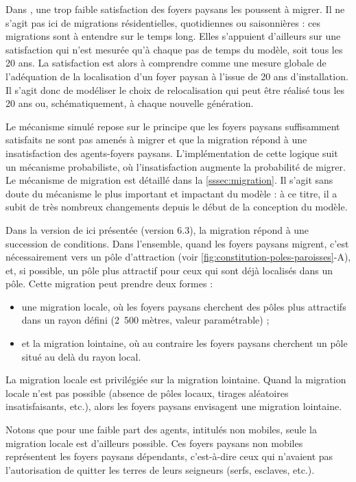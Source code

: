 \begin{tcolorbox}[breakable,left=0pt,right=0pt,top=0pt,bottom=0pt,
	colback=gray!15,colframe=gray!15,width=\dimexpr\textwidth\relax, 
	enlarge left by=0mm, boxsep=5pt,arc=0pt,outer arc=0pt,parbox=false]
Dans \simfeodal{}, une trop faible satisfaction des foyers paysans les poussent à migrer.
Il ne s'agit pas ici de migrations résidentielles, quotidiennes ou saisonnières : ces migrations sont à entendre sur le temps long.
Elles s'appuient d'ailleurs sur une satisfaction qui n'est mesurée qu'à chaque pas de temps du modèle, soit tous les 20 ans.
La satisfaction est alors à comprendre comme une mesure globale de l'adéquation de la localisation d'un foyer paysan à l'issue de 20 ans d'installation.
Il s'agit donc de modéliser le choix de relocalisation qui peut être réalisé tous les 20 ans ou, schématiquement, à chaque nouvelle génération.

Le mécanisme simulé repose sur le principe que les foyers paysans suffisamment satisfaits ne sont pas amenés à migrer et que la migration répond à une insatisfaction des agents-foyers paysans.
L'implémentation de cette logique suit un mécanisme probabiliste, où l'insatisfaction augmente la probabilité de migrer.
Le mécanisme de migration est détaillé dans la \cref{sssec:migration}.
Il s'agit sans doute du mécanisme le plus important et impactant du modèle \simfeodal{} : à ce titre, il a subit de très nombreux changements depuis le début de la conception du modèle.

Dans la version de \simfeodal{} ici présentée (version 6.3), la migration répond à une succession de conditions.
Dans l'ensemble, quand les foyers paysans migrent, c'est nécessairement vers un pôle d'attraction (voir \cref{fig:constitution-poles-paroisses}-A), et, si possible, un pôle plus attractif pour ceux qui sont déjà localisés dans un pôle.
Cette migration peut prendre deux formes :
\begin{itemize}
	\item une migration \og locale\fg{}, où les foyers paysans cherchent des pôles plus attractifs dans un rayon défini (2~500 mètres, valeur paramétrable) ;
	\item et la migration \og lointaine\fg{}, où au contraire les foyers paysans cherchent un pôle situé au delà du rayon local.
\end{itemize} 

La migration locale est privilégiée sur la migration lointaine.
Quand la migration locale n'est pas possible (absence de pôles locaux, tirages aléatoires insatisfaisants, etc.), alors les foyers paysans envisagent une migration lointaine.

Notons que pour une faible part des agents, intitulés \og non mobiles\fg{}, seule la migration locale est d'ailleurs possible.
Ces foyers paysans \og non mobiles\fg{} représentent les foyers paysans dépendants, c'est-à-dire ceux qui n'avaient pas l'autorisation de quitter les terres de leurs seigneurs (serfs, esclaves, etc.).
\end{tcolorbox}

